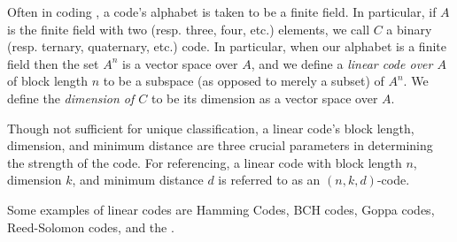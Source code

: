 \documentclass[12pt]{article}
\newcommand{\<}{\langle}
\renewcommand{\>}{\rangle}
\begin{document}
Often in coding , a code's alphabet is taken to be a finite field.  In particular, if $A$ is the finite field with two (resp. three, four, etc.) elements, we call $C$ a binary (resp. ternary, quaternary, etc.) code.  In particular, when our alphabet is a finite field then the set $A^n$ is a vector space over $A$, and we define a \emph{linear code over $A$} of block length $n$ to be a subspace (as opposed to merely a subset) of $A^n$.  We define the \emph{dimension of $C$} to be its dimension as a vector space over $A$.

Though not sufficient for unique classification, a linear code's block length, dimension, and minimum distance are three crucial parameters in determining the strength of the code.  For referencing, a linear code with block length $n$, dimension $k$, and minimum distance $d$ is referred to as an $(n,k,d)$-code.

Some examples of linear codes are Hamming Codes, BCH codes, Goppa codes, Reed-Solomon codes, and the .
\end{document}

